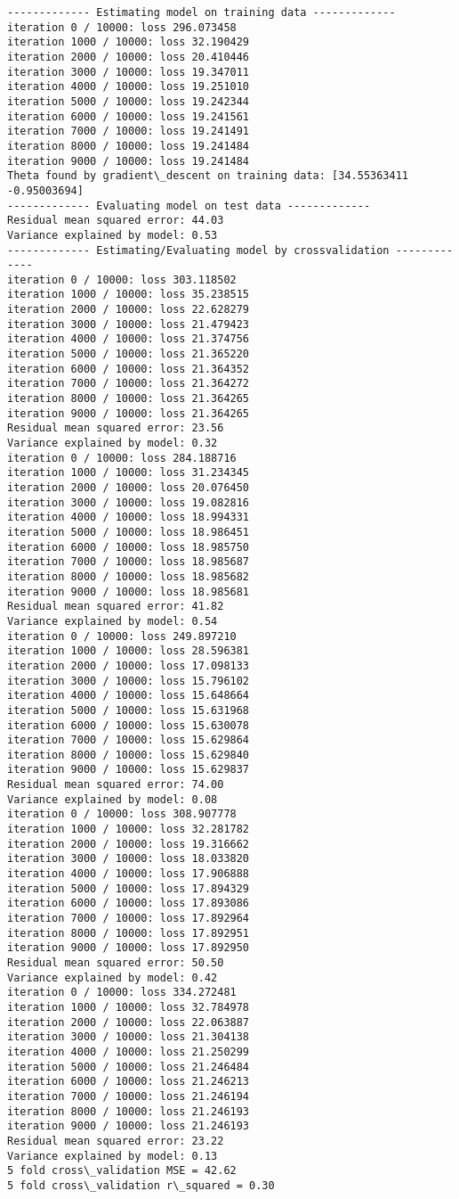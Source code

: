 \documentclass[11pt]{article}
\begin{document}
    \begin{Verbatim}[commandchars=\\\{\}]
------------- Estimating model on training data -------------
iteration 0 / 10000: loss 296.073458
iteration 1000 / 10000: loss 32.190429
iteration 2000 / 10000: loss 20.410446
iteration 3000 / 10000: loss 19.347011
iteration 4000 / 10000: loss 19.251010
iteration 5000 / 10000: loss 19.242344
iteration 6000 / 10000: loss 19.241561
iteration 7000 / 10000: loss 19.241491
iteration 8000 / 10000: loss 19.241484
iteration 9000 / 10000: loss 19.241484
Theta found by gradient\_descent on training data: [34.55363411 -0.95003694]
------------- Evaluating model on test data -------------
Residual mean squared error: 44.03
Variance explained by model: 0.53
------------- Estimating/Evaluating model by crossvalidation -------------
iteration 0 / 10000: loss 303.118502
iteration 1000 / 10000: loss 35.238515
iteration 2000 / 10000: loss 22.628279
iteration 3000 / 10000: loss 21.479423
iteration 4000 / 10000: loss 21.374756
iteration 5000 / 10000: loss 21.365220
iteration 6000 / 10000: loss 21.364352
iteration 7000 / 10000: loss 21.364272
iteration 8000 / 10000: loss 21.364265
iteration 9000 / 10000: loss 21.364265
Residual mean squared error: 23.56
Variance explained by model: 0.32
iteration 0 / 10000: loss 284.188716
iteration 1000 / 10000: loss 31.234345
iteration 2000 / 10000: loss 20.076450
iteration 3000 / 10000: loss 19.082816
iteration 4000 / 10000: loss 18.994331
iteration 5000 / 10000: loss 18.986451
iteration 6000 / 10000: loss 18.985750
iteration 7000 / 10000: loss 18.985687
iteration 8000 / 10000: loss 18.985682
iteration 9000 / 10000: loss 18.985681
Residual mean squared error: 41.82
Variance explained by model: 0.54
iteration 0 / 10000: loss 249.897210
iteration 1000 / 10000: loss 28.596381
iteration 2000 / 10000: loss 17.098133
iteration 3000 / 10000: loss 15.796102
iteration 4000 / 10000: loss 15.648664
iteration 5000 / 10000: loss 15.631968
iteration 6000 / 10000: loss 15.630078
iteration 7000 / 10000: loss 15.629864
iteration 8000 / 10000: loss 15.629840
iteration 9000 / 10000: loss 15.629837
Residual mean squared error: 74.00
Variance explained by model: 0.08
iteration 0 / 10000: loss 308.907778
iteration 1000 / 10000: loss 32.281782
iteration 2000 / 10000: loss 19.316662
iteration 3000 / 10000: loss 18.033820
iteration 4000 / 10000: loss 17.906888
iteration 5000 / 10000: loss 17.894329
iteration 6000 / 10000: loss 17.893086
iteration 7000 / 10000: loss 17.892964
iteration 8000 / 10000: loss 17.892951
iteration 9000 / 10000: loss 17.892950
Residual mean squared error: 50.50
Variance explained by model: 0.42
iteration 0 / 10000: loss 334.272481
iteration 1000 / 10000: loss 32.784978
iteration 2000 / 10000: loss 22.063887
iteration 3000 / 10000: loss 21.304138
iteration 4000 / 10000: loss 21.250299
iteration 5000 / 10000: loss 21.246484
iteration 6000 / 10000: loss 21.246213
iteration 7000 / 10000: loss 21.246194
iteration 8000 / 10000: loss 21.246193
iteration 9000 / 10000: loss 21.246193
Residual mean squared error: 23.22
Variance explained by model: 0.13
5 fold cross\_validation MSE = 42.62
5 fold cross\_validation r\_squared = 0.30

    \end{Verbatim}


    
    
    
    
\end{document}
